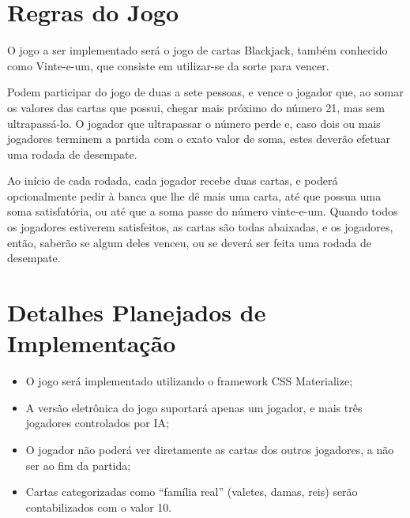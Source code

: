 \documentclass[
  article,
  12pt,
  openany,
  oneside,
  a4paper,
  chapter=TITLE,
  hyphens,
  english,
  brazil,
  sumario=tradicional
]{abntex2}
\begin{document}
\OnehalfSpacing
\pretextual

\imprimirfolhaderosto

\textual

\section{Regras do Jogo}

O jogo a ser implementado será o jogo de cartas Blackjack, também conhecido como Vinte-e-um, que consiste em utilizar-se da sorte para vencer.

Podem participar do jogo de duas a sete pessoas, e vence o jogador que, ao somar os valores das cartas que possui, chegar mais próximo do número 21, mas sem ultrapassá-lo. O jogador que ultrapassar o número perde e, caso dois ou mais jogadores terminem a partida com o exato valor de soma, estes deverão efetuar uma rodada de desempate.

Ao início de cada rodada, cada jogador recebe duas cartas, e poderá opcionalmente pedir à banca que lhe dê mais uma carta, até que possua uma soma satisfatória, ou até que a soma passe do número vinte-e-um. Quando todos os jogadores estiverem satisfeitos, as cartas são todas abaixadas, e os jogadores, então, saberão se algum deles venceu, ou se deverá ser feita uma rodada de desempate.

\section{Detalhes Planejados de Implementação}

\begin{itemize}
\item O jogo será implementado utilizando o framework CSS Materialize;
\item A versão eletrônica do jogo suportará apenas um jogador, e mais três jogadores controlados por IA;
\item O jogador não poderá ver diretamente as cartas dos outros jogadores, a não ser ao fim da partida;
\item Cartas categorizadas como ``família real'' (valetes, damas, reis) serão contabilizados com o valor 10.
\end{itemize}
\end{document}
